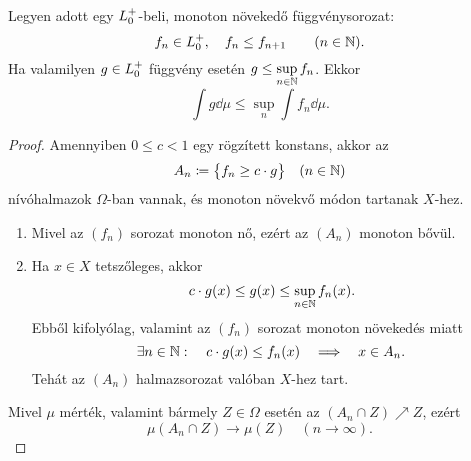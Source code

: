 \documentclass[
]{elteikthesis}[2024/04/26]
\begin{document}
	\begin{theorem}{}{}
		Legyen adott egy \( \StepFuncPlus \)-beli, monoton növekedő függvénysorozat:
		\[
			f_n \in \StepFuncPlus, \quad f_n \leq f_{n + 1} \qquad (n \in \N).
		\]
		Ha valamilyen \( g \in \StepFuncPlus \) függvény
		esetén \( g \leq \sup\limits_{n \in \mathbb{N}} f_n \). Ekkor
		\[
			\int g \dd{\mu} \leq \sup_{n} \int f_n \dd{\mu}.
		\]
	\end{theorem}
	\begin{proof}
		Amennyiben \( 0 \leq c < 1 \) egy rögzített konstans, akkor az
		\[
			A_n \coloneq \bigl\{ f_n \geq c \cdot g \bigr\} \quad (n \in \mathbb{N})
		\]
		nívóhalmazok \( \Omega \)-ban vannak, és monoton növekvő módon tartanak \( X \)-hez.
		
		\begin{enumerate}
			\item Mivel az \( (f_n) \) sorozat monoton nő, ezért az \( (A_n) \) monoton bővül. \checkmark
			\item Ha \( x \in X \) tetszőleges, akkor
			\[
				c \cdot g(x) \leq g(x) \leq \sup_{n \in \mathbb{N}} f_n(x).
			\]
			Ebből kifolyólag, valamint az \( (f_n) \) sorozat monoton növekedés miatt
			\[
				\exists n \in \mathbb{N} \, \colon \quad
				c \cdot g(x) \leq f_n(x)
				\quad \Longrightarrow \quad
				x \in A_n.
			\]
			Tehát az \( (A_n) \) halmazsorozat valóban \( X \)-hez tart. \checkmark
		\end{enumerate}
			
%			
		
		Mivel \( \mu \) mérték, valamint bármely \( Z \in \Omega \) esetén 
		az \( (A_n \cap Z) \nearrow Z \), ezért
		\[
			\mu(A_n \cap Z) \longrightarrow \mu(Z) \quad (n \to \infty).
		\]
		

\end{proof}
\end{document}
